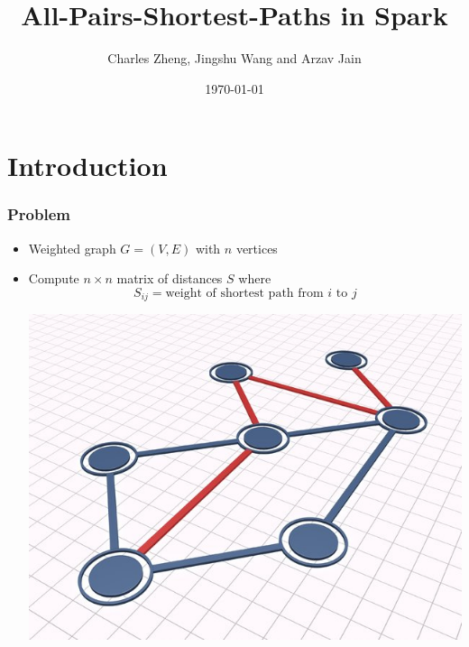\documentclass{beamer}
\title{All-Pairs-Shortest-Paths in Spark}
\author{Charles Zheng, Jingshu Wang and Arzav Jain} %
\institute[Stanford] %
{Stanford University}
\date{\today} %
\begin{document}
\begin{frame}
\titlepage %
\end{frame}

\section{Introduction}

\begin{frame}
\frametitle{Problem}
\begin{itemize}
\item Weighted graph $G = (V, E)$ with $n$ vertices
\item Compute $n \times n$ matrix of distances $S$ where
\[
S_{ij} = \text{weight of shortest path from $i$ to $j$}
\]
\begin{center}
\includegraphics[scale = 0.3]{stock_sp.jpg}
\end{center}
\end{itemize}
\end{frame}
\end{document}
